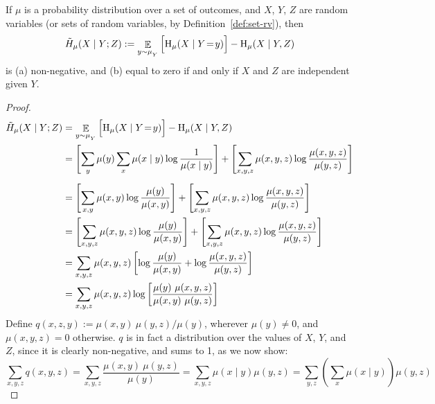 \documentclass{article}
\numberwithin{equation}{section}
\begin{document}
\begin{lemma} \label{lem:bnmaxent-component}
	If $\mu$ is a probability distribution over a set of outcomes, and $X$, $Y$, $Z$ are random variables (or sets of random variables, by Definition~\ref{def:set-rv}), then 
	\[ \tilde H_\mu(X \mid Y; Z) := \mathop{\mathbb E}_{y \sim \mu_{_{Y}}} \Big[ \mathrm{H}_\mu(X \mid Y \!=\!y) \Big]  - \mathrm{H}_\mu( X \mid Y, Z)\]
	is (a) non-negative, and (b) equal to zero if and only if $X$ and $Z$ are independent given $Y$.
\end{lemma}
\begin{proof}
	\begin{align*}
		\tilde H_\mu(X \mid Y; Z) &= \mathop{\mathbb E}_{y \sim \mu_{_{Y}}}  \Big[ \mathrm{H}_\mu(X \mid Y \!=\!y)\Big] - \mathrm{H}_\mu( X \mid Y, Z)  \\
		&=  \left[\sum_{y} \mu(y) \sum_x  \mu(x\mid y) \log \frac{1}{\mu(x \mid y)} \right]+ \left[\sum_{x,y, z} \mu(x, y, z) \log \frac{\mu(x,y,z)}{\mu(y, z)}\right] \\[0.5em]
		&= \left[\sum_{x,y} \mu(x,y) \log \frac{\mu(y)}{\mu(x,y)}
		\right] + {\left[\sum_{x,y, z} \mu(x, y, z) \log \frac{\mu(x,y,z)}{\mu(y, z)} \right]} \\
		&= \left[\sum_{x,y, z} \mu(x,y ,z) \log \frac{\mu(y)}{\mu(x,y)}
		\right] + {\left[\sum_{x,y, z} \mu(x, y, z) \log \frac{\mu(x,y,z)}{\mu(y, z)} \right]} \\
		&= \sum_{x,y, z} \mu(x,y ,z) \left[ \log \frac{\mu(y)}{\mu(x,y)} + \log \frac{\mu(x,y,z)}{\mu(y, z)} \right] \\
		&= \sum_{x,y, z}  \mu(x,y ,z) \log \left[\frac{\mu(y)\ \mu(x,y,z)}{\mu(x,y)\ \mu(y,z)} \right]  \\
	\end{align*}
	Define $q(x,z,y) := {\mu(x,y)\ \mu(y,z) }/{\mu(y)}$, wherever $\mu(y)\neq 0$, and $\mu(x,y,z) = 0$ otherwise. $q$ is in fact a distribution over the values of $X$, $Y$, and $Z$, since it 
	is clearly non-negative, and sums to 1, as we now show:
	\[
	\sum_{x,y,z} q(x,y, z) = \sum_{x,y,z} \frac{\mu(x,y)\ \mu(y,z)}{\mu(y)}
	= \sum_{x,y,z} \mu(x \mid y) \mu(y,z)
	= \sum_{y,z} \left(\sum_x \mu(x \mid y)\right) \mu(y,z)
\]
\end{proof}
\end{document}
